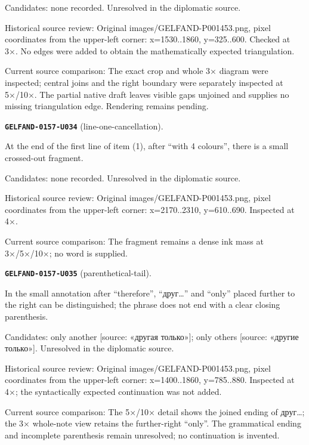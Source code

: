 Candidates: none recorded. Unresolved in the diplomatic source.\par
Historical source review: Original images/GELFAND-P001453.png, pixel coordinates from the upper-left corner: x=1530..1860, y=325..600. Checked at 3×. No edges were added to obtain the mathematically expected triangulation.\par
Current source comparison: The exact crop and whole 3× diagram were inspected; central joins and the right boundary were separately inspected at 5×/10×. The partial native draft leaves visible gaps unjoined and supplies no missing triangulation edge. Rendering remains pending.\par\medskip
\par\noindent\leavevmode{}\label{GELFAND-0157-U034}\label{GELFAND-P001453:line-one-cancellation}\textbf{\texttt{GELFAND-0157-U034}} (line-one-cancellation).\nopagebreak[4]\par
At the end of the first line of item (1), after “with 4 colours”, there is a small crossed-out fragment.\par
Candidates: none recorded. Unresolved in the diplomatic source.\par
Historical source review: Original images/GELFAND-P001453.png, pixel coordinates from the upper-left corner: x=2170..2310, y=610..690. Inspected at 4×.\par
Current source comparison: The fragment remains a dense ink mass at 3×/5×/10×; no word is supplied.\par\medskip
\par\noindent\leavevmode{}\label{GELFAND-0157-U035}\label{GELFAND-P001453:parenthetical-tail}\textbf{\texttt{GELFAND-0157-U035}} (parenthetical-tail).\nopagebreak[4]\par
In the small annotation after “therefore”, “друг…” and “only” placed further to the right can be distinguished; the phrase does not end with a clear closing parenthesis.\par
Candidates: only another [source: «другая только»]; only others [source: «другие только»]. Unresolved in the diplomatic source.\par
Historical source review: Original images/GELFAND-P001453.png, pixel coordinates from the upper-left corner: x=1400..1860, y=785..880. Inspected at 4×; the syntactically expected continuation was not added.\par
Current source comparison: The 5×/10× detail shows the joined ending of друг…; the 3× whole-note view retains the further-right “only”. The grammatical ending and incomplete parenthesis remain unresolved; no continuation is invented.\par\medskip
